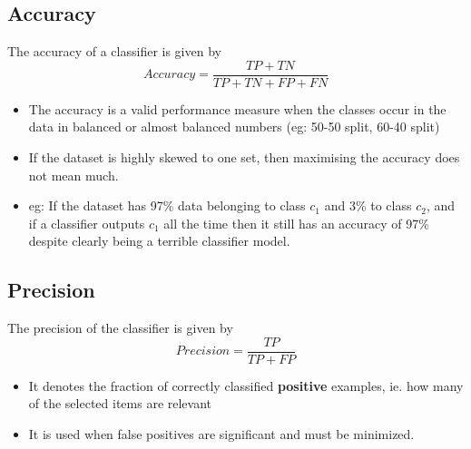\documentclass{article}
\theoremstyle{plain}
\theoremstyle{definition}
\begin{document}
\subsection{Accuracy}
The accuracy of a classifier is given by
\begin{equation}
    Accuracy = \frac{TP + TN}{TP+TN+FP+FN}
\end{equation}

\begin{itemize}
    \item The accuracy is a valid performance measure when the classes occur in the data in balanced  or almost balanced numbers (eg: 50-50 split, 60-40 split)
    
    \item If the dataset is highly skewed to one set, then maximising the accuracy does not mean much. 
    
    \item eg: If the dataset has 97\% data belonging to class $c_1$ and 3\% to class $c_2$, and if a classifier outputs $c_1$ all the time then it still has an accuracy of 97\% despite clearly being a terrible classifier model. 
\end{itemize}

\subsection{Precision}
The precision of the classifier is given by
\begin{equation}
    Precision = \frac{TP}{TP+FP}
\end{equation}
\begin{itemize}
    \item It denotes the fraction of correctly classified \textbf{positive} examples, ie. how many of the selected items are relevant
    
    \item It is used when false positives are significant and must be minimized.
\end{itemize}
\end{document}
